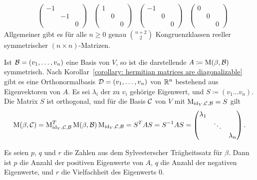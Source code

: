 \begin{example}
\[\begin{matrix}
    &
      \begin{pmatrix}
        -1  &    &   \\
            & -1 &   \\
            &    & 0
      \end{pmatrix}
    &
      \begin{pmatrix}
        1 &   &   \\
          & 0 &   \\
          &   & 0
      \end{pmatrix}
    &
      \begin{pmatrix}
        -1  &   &   \\
            & 0 &   \\
            &   & 0
      \end{pmatrix}
    &
      \begin{pmatrix}
        0 &   &   \\
          & 0 &   \\
          &   & 0
      \end{pmatrix}
    \end{matrix}
  \]
  Allgemeiner gibt es für alle $n \geq 0$ genau $\binom{n+2}{2}$ Kongruenzklassen reeller symmetrischer $(n \times n)$-Matrizen.
\end{example}

Ist $\mathcal{B} = (v_1, \dotsc, v_n)$ eine Basis von $V$, so ist die darstellende $A \coloneqq \operatorname{M}(\beta, \mathcal{B})$ symmetrisch.
Nach Korollar~\ref{corollary: hermitian matrices are diagonalizable} gibt es eine Orthonormalbasis $\mathcal{D} = (v_1, \dotsc, v_n)$ von $\mathbb{R}^n$ bestehend aus Eigenvektoren von $A$.
Es sei $\lambda_i$ der zu $v_i$ gehörige Eigenwert, und $S \coloneqq (v_1 \dotsc v_n)$.
Die Matrix $S$ ist orthogonal, und für die Basis $\mathcal{C}$ von $V$ mit $\operatorname{M}_{\operatorname{id}_V, \mathcal{C}, \mathcal{B}} = S$ gilt
\[
    \operatorname{M}(\beta, \mathcal{C})
  = \operatorname{M}_{\operatorname{id}_V, \mathcal{C}, \mathcal{B}} ^T
    \operatorname{M}(\beta, \mathcal{B})
    \operatorname{M}_{\operatorname{id}_V, \mathcal{C}, \mathcal{B}}
  = S^T A S
  = S^{-1} A S
  = \begin{pmatrix}
      \lambda_1 &         &           \\
                & \ddots  &           \\
                &         & \lambda_n
    \end{pmatrix}.
\]

\begin{proposition}
  Es seien $p$, $q$ und $r$ die Zahlen aus dem Sylvesterscher Trägheitssatz für $\beta$.
  Dann ist $p$ die Anzahl der positiven Eigenwerte von $A$, $q$ die Anzahl der negativen Eigenwerte, und $r$ die Vielfachheit des Eigenwerts $0$.
\end{proposition}

